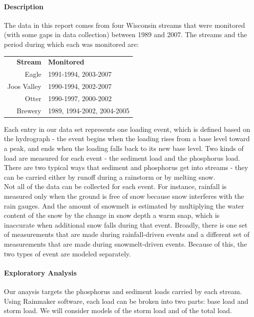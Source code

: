 \documentclass[12pt]{article}
\begin{document}
\paragraph{Description}
The data in this report comes from four Wisconsin streams that were monitored (with some gaps in data collection) between 1989 and 2007. The streams and the period during which each was monitored are:

\begin{table}[h]
\begin{center}
\begin{tabular}{r l}
        \textbf{Stream} & \textbf{Monitored} \\
        Eagle & 1991-1994, 2003-2007\\
        Joos Valley & 1990-1994, 2002-2007\\
        Otter & 1990-1997, 2000-2002\\
        Brewery & 1989, 1994-2002, 2004-2005\\
    \end{tabular}
\end{center}
\end{table}

Each entry in our data set represents one loading event, which is defined based on the hydrograph - the event begins when the loading rises from a base level toward a peak, and ends when the loading falls back to its new base level. Two kinds of load are measured for each event - the sediment load and the phosphorus load. There are two typical ways that sediment and phosphorus get into streams - they can be carried either by runoff during a rainstorm or by melting snow.\\

Not all of the data can be collected for each event. For instance, rainfall is measured only when the ground is free of snow because snow interferes with the rain gauges. And the amount of snowmelt is estimated by multiplying the water content of the snow by the change in snow depth a warm snap, which is inaccurate when additional snow falls during that event. Broadly, there is one set of measurements that are made during rainfall-driven events and a different set of measurements that are made during snowmelt-driven events. Because of this, the two types of event are modeled separately.\\

\paragraph{Exploratory Analysis}
Our anaysis targets the phosphorus and sediment loads carried by each stream. Using Rainmaker software, each load can be broken into two parts: base load and storm load. We will consider models of the storm load and of the total load.\\
\end{document}
